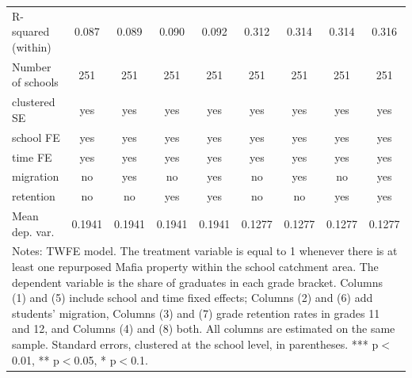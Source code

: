 \documentclass[12pt]{article}
\theoremstyle{plain}
\theoremstyle{plain}
\theoremstyle{plain}
\theoremstyle{definition}
\theoremstyle{plain}
\theoremstyle{definition}
\theoremstyle{plain}
\theoremstyle{remark}
\theoremstyle{definition}
\theoremstyle{definition}
\theoremstyle{plain}
\begin{document}
\begin{table}[H]
{\begin{tabular}{p{14.835em}llllllll}
			\multicolumn{1}{l}{R-squared (within)} & \multicolumn{1}{c}{0.087} & \multicolumn{1}{c}{0.089} & \multicolumn{1}{c}{0.090} & \multicolumn{1}{c}{0.092} & \multicolumn{1}{c}{0.312} & \multicolumn{1}{c}{0.314} & \multicolumn{1}{c}{0.314} & \multicolumn{1}{c}{0.316} \\
			\multicolumn{1}{l}{Number of schools} & \multicolumn{1}{c}{251} & \multicolumn{1}{c}{251} & \multicolumn{1}{c}{251} & \multicolumn{1}{c}{251} & \multicolumn{1}{c}{251} & \multicolumn{1}{c}{251} & \multicolumn{1}{c}{251} & \multicolumn{1}{c}{251} \\
			\multicolumn{1}{l}{clustered SE} & \multicolumn{1}{c}{yes} & \multicolumn{1}{c}{yes} & \multicolumn{1}{c}{yes} & \multicolumn{1}{c}{yes} & \multicolumn{1}{c}{yes} & \multicolumn{1}{c}{yes} & \multicolumn{1}{c}{yes} & \multicolumn{1}{c}{yes} \\
			\multicolumn{1}{l}{school FE} & \multicolumn{1}{c}{yes} & \multicolumn{1}{c}{yes} & \multicolumn{1}{c}{yes} & \multicolumn{1}{c}{yes} & \multicolumn{1}{c}{yes} & \multicolumn{1}{c}{yes} & \multicolumn{1}{c}{yes} & \multicolumn{1}{c}{yes} \\
			\multicolumn{1}{l}{time FE} & \multicolumn{1}{c}{yes} & \multicolumn{1}{c}{yes} & \multicolumn{1}{c}{yes} & \multicolumn{1}{c}{yes} & \multicolumn{1}{c}{yes} & \multicolumn{1}{c}{yes} & \multicolumn{1}{c}{yes} & \multicolumn{1}{c}{yes} \\
			\multicolumn{1}{l}{migration} & \multicolumn{1}{c}{no} & \multicolumn{1}{c}{yes} & \multicolumn{1}{c}{no} & \multicolumn{1}{c}{yes} & \multicolumn{1}{c}{no} & \multicolumn{1}{c}{yes} & \multicolumn{1}{c}{no} & \multicolumn{1}{c}{yes} \\
			\multicolumn{1}{l}{retention} & \multicolumn{1}{c}{no} & \multicolumn{1}{c}{no} & \multicolumn{1}{c}{yes} & \multicolumn{1}{c}{yes} & \multicolumn{1}{c}{no} & \multicolumn{1}{c}{no} & \multicolumn{1}{c}{yes} & \multicolumn{1}{c}{yes} \\
			\multicolumn{1}{l}{Mean dep. var.} & \multicolumn{1}{c}{0.1941} & \multicolumn{1}{c}{0.1941} & \multicolumn{1}{c}{0.1941} & \multicolumn{1}{c}{0.1941} & \multicolumn{1}{c}{0.1277} & \multicolumn{1}{c}{0.1277} & \multicolumn{1}{c}{0.1277} & \multicolumn{1}{c}{0.1277} \\
			\midrule
			\multicolumn{9}{p{47.275em}}{Notes: TWFE model. The treatment variable is equal to 1 whenever there is at least one repurposed Mafia property within the school catchment area. The dependent variable is the share of graduates in each grade bracket. Columns (1) and (5) include school and time fixed effects; Columns (2) and (6) add students' migration, Columns (3) and (7) grade retention rates in grades 11 and 12, and Columns (4) and (8) both. All columns are estimated on the same sample. Standard errors, clustered at the school level, in parentheses. *** p$<$0.01, ** p$<$0.05, * p$<$0.1.} \\
		\end{tabular}%
	}
\end{table}
\end{document}
